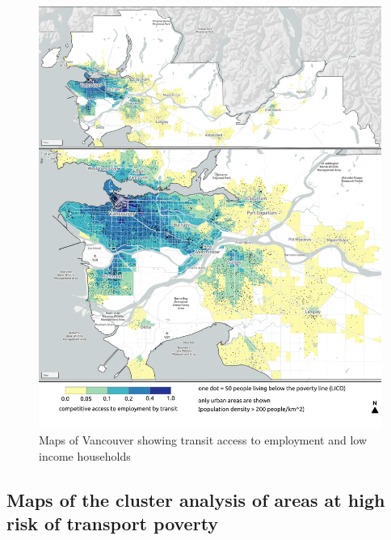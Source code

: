 \documentclass[11 pt, letterpaper]{article}
\begin{document}
{\begin{figure}[H]
	\caption{Maps of Vancouver showing transit access to employment and low income households} 
	\label{a_van}
	\centerline{\includegraphics[width=6.5in]{figures/appendix_maps/a_van.png}}
	\vspace{2mm}
\end{figure}

\subsection{Maps of the cluster analysis of areas at high risk of transport poverty}

}
\end{document}

